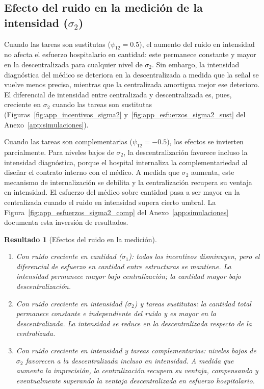 \documentclass[12pt, a4paper, twoside, openright]{book}
\theoremstyle{plain}
\newtheorem{result}{Resultado}[chapter]
\theoremstyle{definition}
\theoremstyle{remark}
\begin{document}
\subsection{Efecto del ruido en la medición de la intensidad (\texorpdfstring{$\sigma_2$}{sigma\_2})}

Cuando las tareas son sustitutas ($\psi_{12}=0.5$), el aumento del ruido en intensidad no afecta el esfuerzo hospitalario en cantidad: este permanece constante y mayor en la descentralizada para cualquier nivel de $\sigma_2$. Sin embargo, la intensidad diagnóstica del médico se deteriora en la descentralizada a medida que la señal se vuelve menos precisa, mientras que la centralizada amortigua mejor ese deterioro. El diferencial de intensidad entre centralizada y descentralizada es, pues, creciente en $\sigma_2$ cuando las tareas son sustitutas (Figuras~\ref{fig:app_incentivos_sigma2} y~\ref{fig:app_esfuerzos_sigma2_sust} del Anexo~\ref{app:simulaciones}).

Cuando las tareas son complementarias ($\psi_{12}=-0.5$), los efectos se invierten parcialmente. Para niveles bajos de $\sigma_2$, la descentralización favorece incluso la intensidad diagnóstica, porque el hospital internaliza la complementariedad al diseñar el contrato interno con el médico. A medida que $\sigma_2$ aumenta, este mecanismo de internalización se debilita y la centralización recupera su ventaja en intensidad. El esfuerzo del médico sobre cantidad pasa a ser mayor en la centralizada cuando el ruido en intensidad supera cierto umbral. La Figura~\ref{fig:app_esfuerzos_sigma2_comp} del Anexo~\ref{app:simulaciones} documenta esta inversión de resultados.

\begin{result}[Efectos del ruido en la medición]
\label{res:ruido}
\begin{enumerate}[label=(\alph*)]
  \item Con ruido creciente en cantidad ($\sigma_1$): todos los incentivos disminuyen, pero el diferencial de esfuerzo en cantidad entre estructuras se mantiene. La intensidad permanece mayor bajo centralización; la cantidad mayor bajo descentralización.
  \item Con ruido creciente en intensidad ($\sigma_2$) y tareas sustitutas: la cantidad total permanece constante e independiente del ruido y es mayor en la descentralizada. La intensidad se reduce en la descentralizada respecto de la centralizada.
  \item Con ruido creciente en intensidad y tareas complementarias: niveles bajos de $\sigma_2$ favorecen a la descentralizada incluso en intensidad. A medida que aumenta la imprecisión, la centralización recupera su ventaja, compensando y eventualmente superando la ventaja descentralizada en esfuerzo hospitalario.
\end{enumerate}
\end{result}
\end{document}

